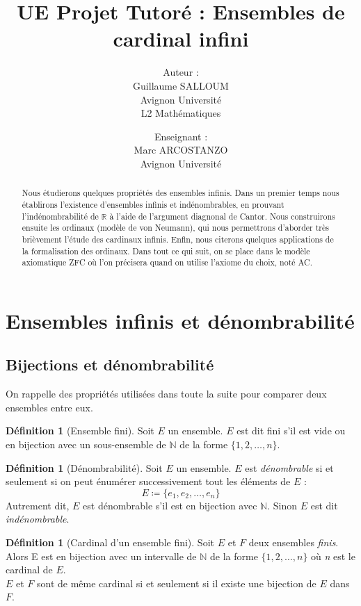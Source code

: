 \documentclass{article}
\title{UE Projet Tutoré : Ensembles de cardinal infini}
\author{Auteur :\\
	Guillaume SALLOUM \\ 
	Avignon Université \\ 
	L2 Mathématiques
	\and
	Enseignant : \\
	Marc ARCOSTANZO \\
	Avignon Université}
\date{}
\theoremstyle{definition}
\newtheorem{definition}[subsubsection]{Définition}
\theoremstyle{plain}
\theoremstyle{plain}
\theoremstyle{plain}
\theoremstyle{plain}
\theoremstyle{plain}
\begin{document}
\maketitle
\begin{abstract}
	Nous étudierons quelques propriétés des ensembles infinis. 
	Dans un premier temps nous établirons l'existence d'ensembles infinis et indénombrables, en prouvant l'indénombrabilité de \( \mathbb{R} \) à l'aide de l'argument diagnonal de Cantor. 
	Nous construirons ensuite les ordinaux (modèle de von Neumann), qui nous permettrons d'aborder très brièvement l'étude des cardinaux infinis. Enfin, nous citerons quelques applications de la formalisation des ordinaux.
	Dans tout ce qui suit, on se place dans le modèle axiomatique ZFC où l'on précisera quand on utilise l'axiome du choix, noté AC. 
\end{abstract}


\tableofcontents
\clearpage
\section{Ensembles infinis et dénombrabilité}
\subsection{Bijections et dénombrabilité}

On rappelle des propriétés utilisées dans toute la suite pour comparer deux ensembles entre eux.

\begin{definition}[Ensemble fini]
	Soit \( E \) un ensemble.
	\( E \) est dit fini s'il est vide ou en bijection avec un sous-ensemble de \( \mathbb{N} \) de la forme \( \{1, 2, \ldots, n\} \).
\end{definition}

\begin{definition}[Dénombrabilité]
	Soit \( E \) un ensemble. \( E \) est \textit{dénombrable} si et seulement si on peut énumérer successivement tout les éléments de \( E \) :
\begin{equation*}
	E \coloneqq \{e_{1}, e_{2}, \ldots, e_{n}\} 
\end{equation*} 
	Autrement dit, \( E \) est dénombrable s'il est en bijection avec \( \mathbb{N} \). Sinon \( E \) est dit \textit{indénombrable}.
\end{definition}
\begin{definition}[Cardinal d'un ensemble fini]
	Soit \( E \) et \( F \) deux ensembles \textit{finis}.
	Alors E est en bijection avec un intervalle de \( \mathbb{N} \) de la forme \( \{1, 2, \ldots, n\} \) où \textit{n} est le cardinal de \( E \). \\
	\( E \) et \( F \) sont de même cardinal si et seulement si il existe une bijection de \( E \) dans \( F \).
\
\end{definition}
\end{document}
